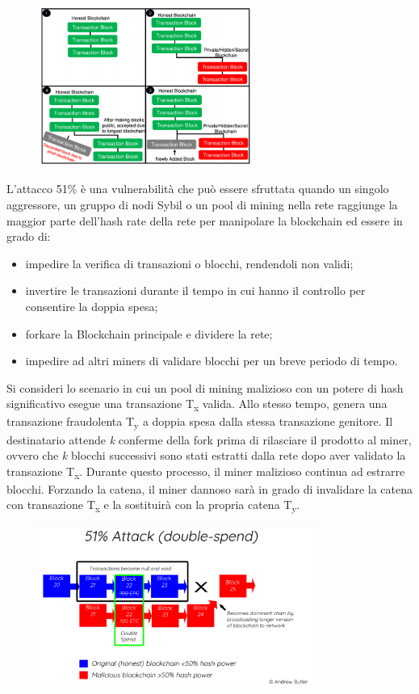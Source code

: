 \begin{figure}[htb!]
    \centering
    \includegraphics[width=7cm]{./Images/cap5/5.2.png}
\end{figure}

L'attacco 51\% è una vulnerabilità che può essere sfruttata quando un singolo aggressore, un gruppo di nodi Sybil o un pool di mining nella rete raggiunge la maggior parte dell'hash rate della rete per manipolare la blockchain ed essere in grado di:
\begin{itemize}
    \item impedire la verifica di transazioni o blocchi, rendendoli non validi;
    \item invertire le transazioni durante il tempo in cui hanno il controllo per consentire la doppia spesa;
    \item forkare la Blockchain principale e dividere la rete;
    \item impedire ad altri miners di validare blocchi per un breve periodo di tempo.
\end{itemize}
Si consideri lo scenario in cui un pool di mining malizioso con un potere di hash significativo esegue una transazione T\textsubscript{x} valida. Allo stesso tempo, genera una transazione fraudolenta T\textsubscript{y} a doppia spesa dalla stessa transazione genitore. Il destinatario attende \textit{k} conferme della fork prima di rilasciare il prodotto al miner, ovvero che \textit{k} blocchi successivi sono stati estratti dalla rete dopo aver validato la transazione T\textsubscript{x}. Durante questo processo, il miner malizioso continua ad estrarre blocchi. Forzando la catena, il miner dannoso sarà in grado di invalidare la catena con transazione T\textsubscript{x} e la sostituirà con la propria catena T\textsubscript{y}.

\begin{figure}[htb!]
    \centering
    \includegraphics[width=9cm]{./Images/cap5/5.3.png}
\end{figure}

